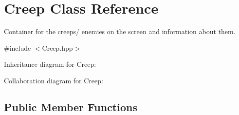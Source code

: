 \hypertarget{class_creep}{\section{Creep Class Reference}
\label{class_creep}
}


Container for the creeps/ enemies on the screen and information about them.  




{\ttfamily \#include $<$Creep.\+hpp$>$}



Inheritance diagram for Creep\+:


Collaboration diagram for Creep\+:
\subsection*{Public Member Functions}
